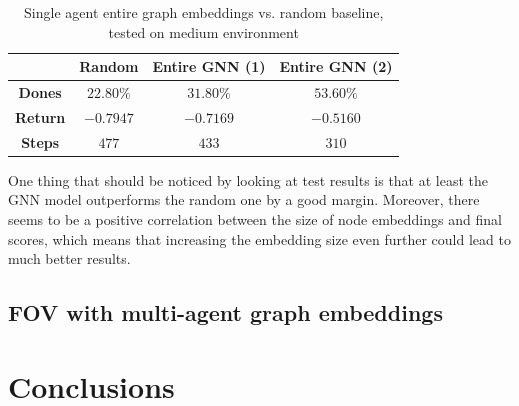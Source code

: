 \documentclass[a4paper,10pt]{report}
\begin{document}
\begin{table}[h]
	\center
	\begin{tabular}{|c|c|c|c|}
		\hline & \textbf{Random} & \textbf{Entire GNN (1)} & \textbf{Entire GNN (2)} \\ \hline
		\textbf{Dones} & $22.80\%$ & $31.80\%$ & $53.60\%$ \\ \hline
		\textbf{Return}& $-0.7947$ & $-0.7169$   & $-0.5160$ \\ \hline
		\textbf{Steps}& $477$ & $433$  & $310$ \\ \hline
	\end{tabular}
	\caption{Single agent entire graph embeddings vs. random baseline, tested on medium environment}
	\label{table:entire-gnn-res}
\end{table}

One thing that should be noticed by looking at test results is that at least the GNN model outperforms the random one by a good margin. Moreover, there seems to be a positive correlation between the size of node embeddings and final scores, which means that increasing the embedding size even further could lead to much better results.

\section*{FOV with multi-agent graph embeddings}\label{sec:fov-dqn-gnn-robot-res}

\chapter{Conclusions}

\printbibliography
\end{document}
